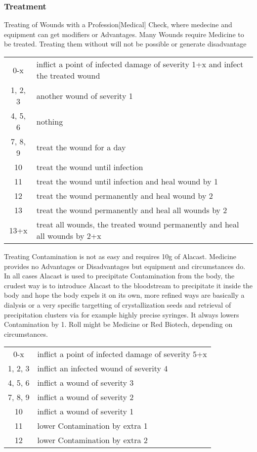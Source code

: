     \subsubsection{Treatment}
    Treating of Wounds with a Profession[Medical] Check, where medecine and equipment can get modifiers or Advantages.
    Many Wounds require Medicine to be treated.
    Treating them without will not be possible or generate disadvantage\vspace{1.5cm}
    \begin{tabular}{cl}
        0-x & inflict a point of infected damage of severity 1+x and infect the treated wound\\
        1, 2, 3 & another wound of severity 1\\
        4, 5, 6 & nothing\\
        7, 8, 9 & treat the wound for a day\\
        10 & treat the wound until infection \\
        11 & treat the wound until infection and heal wound by 1 \\
        12 & treat the wound permanently and heal wound by 2 \\
        13 & treat the wound permanently and heal all wounds by 2\\
        13+x & treat all wounds, the treated wound permanently and heal all wounds by 2+x\\
    \end{tabular}\vspace{1.5cm}
    Treating Contamination is not as easy and requires 10g of Alacast.
    Medicine provides no Advantages or Disadvantages
    but equipment and circumstances do.
    In all cases Alacast is used to precipitate Contamination from the body, the
    crudest way is to introduce Alacast to the bloodstream to precipitate it inside the body and hope the body expels
    it on its own, more refined ways are basically a dialysis or a very specific targetting of crystallization seeds
    and retrieval of precipitation clusters via for example highly precise syringes.
    It always lowers Contamination by 1.
    Roll might be Medicine or Red Biotech, depending on circumstances.
        \begin{tabular}{cl}
        0-x & inflict a point of infected damage of severity 5+x \\
        1, 2, 3 & inflict an infected wound of severity 4 \\
        4, 5, 6 & inflict a wound of severity 3\\
        7, 8, 9 & inflict a wound of severity 2\\
        10 & inflict a wound of severity 1\\
        11 & lower Contamination by extra 1 \\
        12 & lower Contamination by extra 2 \\
    \end{tabular}\vspace{1.5cm}
